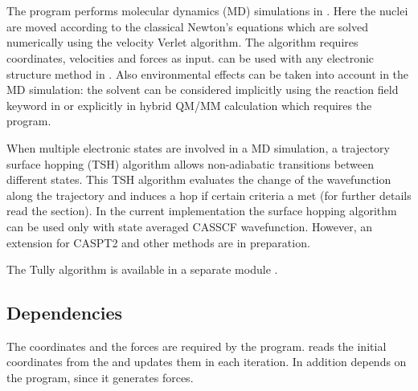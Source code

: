 
\section{}
\label{UG:sec:dynamix}

The  program performs molecular dynamics (MD)
simulations in \molcas. Here the nuclei are moved according to the
classical Newton's equations which are solved numerically using the
velocity Verlet algorithm\cite{swope:637}. The algorithm requires
coordinates, velocities and forces as input.  can be
used with any electronic structure method in \molcas. Also environmental
effects can be taken into account in the MD simulation: the solvent can be
considered implicitly using the reaction field keyword in 
or explicitly in hybrid QM/MM calculation which requires the 
program.

When multiple electronic states are involved in a MD simulation, a trajectory
surface hopping (TSH) algorithm allows non-adiabatic transitions between
different states. This TSH algorithm evaluates the change of the wavefunction
along the trajectory and induces a hop if certain criteria a met (for further
details read the  section). In the current implementation the
surface hopping algorithm can be used only with state averaged CASSCF
wavefunction. However, an extension for CASPT2 and other methods are in preparation.

The Tully algorithm is available in a separate module .

\subsection{Dependencies}
\label{UG:sec:dynamix_dependencies}
The coordinates and the forces are required by the  program.
 reads the initial coordinates from the  and
updates them in each iteration. In addition  depends on the
 program, since it generates forces.

